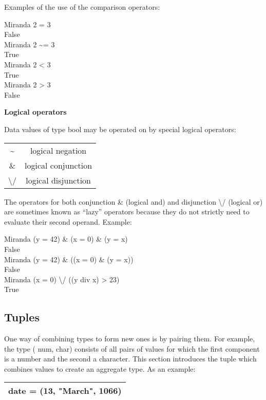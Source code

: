 \documentclass[11pt]{article}
\begin{document}
Examples of the use of the comparison operators:
\begin{tcolorbox}
Miranda 2 = 3 \\
False\\
Miranda 2 \~{}= 3\\
True\\
Miranda 2 < 3 \\
True\\
Miranda 2 > 3 \\
False
\end{tcolorbox}

\textbf{Logical operators}


Data values of type bool may be operated on by special logical operators: \\

\begin{center}

\begin{tabular}{|c|c|}
   \hline
   \~{}   &  logical negation\\
   \&{}  & logical conjunction\\
   \textbackslash / & logical disjunction\\
   \hline
\end{tabular}

\end{center}
The operators for both conjunction \&{} (logical and) and disjunction \textbackslash /
(logical or) are sometimes known as “lazy” operators because they do not strictly
need to evaluate their second operand.
Example:
\begin{tcolorbox}

Miranda (y = 42) \& (x = 0) \& (y = x)\\
False\\
Miranda (y = 42) \& ((x = 0) \& (y = x))\\
False\\
Miranda (x = 0) \textbackslash / ((y div x) > 23)\\
True

\end{tcolorbox}

\subsection{Tuples}
One way of combining types to form new ones is by pairing them. For
example, the type ( num, char) consists of all pairs of values for which the first component is a number and the second a character.
This section introduces the tuple which combines values to create an aggregate
type. As an example:
\begin{center}
\begin{tabular}{ |c| } 
 \hline
 date = (13, "March", 1066)  \\ 
\hline
\end{tabular}
\label{Tab:1}
\end{center}
\end{document}
